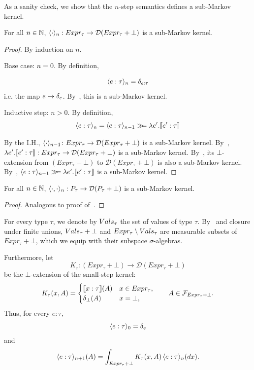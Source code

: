 %
%
As a sanity check, we show that the $n$-step semantics defines a sub-Markov kernel.

\begin{lemma}\label{lem:big-step-n-kernel}
	For all $n \in \mathbb{N}$, $\langle \cdot \rangle_{n} : Expr_{\tau} \to \mathcal{D}(Expr_{\tau} + \bot)$ is a sub-Markov kernel.
\end{lemma}

\begin{proof}
	By induction on $n$. 

	Base case: $n = 0$. By definition, 
	
	\[
		\langle e : \tau \rangle_{n} = \delta_{e : \tau}
	\]
	i.e. the map $e \mapsto \delta_{e}$. By~, this is a sub-Markov kernel.

	Inductive step: $n > 0$. By definition, 
	\[
		\langle e : \tau \rangle_{n} = \langle e : \tau \rangle_{n-1} \gg\!\!=  \lambda e'. \llbracket e' : \tau \rrbracket
	\]
	
	By the I.H., $\langle \cdot \rangle_{n-1} \colon Expr_{\tau} \to \mathcal{D}(Expr_{\tau} + \bot)$ is a sub-Markov kernel. By~, $\lambda e' .\llbracket e' : \tau \rrbracket : Expr_{\tau} \to \mathcal{D}(Expr_{\tau} + \bot)$ is a sub-Markov kernel. By~, its $\bot$-extension from $(Expr_{\tau} + \bot)$ to $\mathcal{D}(Expr_{\tau} + \bot)$ is also a sub-Markov kernel. By~, $\langle e : \tau \rangle_{n-1} \gg\!\!=  \lambda e'. \llbracket e' : \tau \rrbracket$ is a sub-Markov kernel.
\end{proof}

\begin{lemma}\label{lem:big-step-n-coupling-kernel}
	For all $n \in \mathbb{N}$, $\langle \cdot, \cdot \rangle_{n} : P_{\tau} \to \mathcal{D}(P_{\tau} + \bot)$ is a sub-Markov kernel.
\end{lemma}

\begin{proof}
	Analogous to proof of~.
\end{proof}

For every type $\tau$, we denote by $Vals_\tau$ the set of values of
type $\tau$. By~ and closure under finite unions,
$Vals_\tau+\bot$ and $Expr_\tau\setminus Vals_\tau$ are measurable
subsets of $Expr_\tau+\bot$, which we equip with their subspace
$\sigma$-algebras. 

Furthermore, let
\[
K_\tau:(Expr_\tau+\bot)\to\mathcal D(Expr_\tau+\bot)
\]
be the \(\bot\)-extension of the small-step kernel:
\[
K_\tau(x,A)
=
\begin{cases}
\llbracket x:\tau \rrbracket(A) & x\in Expr_\tau,\\
\delta_\bot(A)  & x=\bot,
\end{cases}
\qquad
A\in\mathcal F_{Expr_\tau+\bot}.
\]
Thus, for every \(e:\tau\),
\[
\langle e:\tau \rangle_{0}=\delta_e
\]
and
\[
\langle e:\tau \rangle_{n+1}(A)
=
\int_{Expr_\tau+\bot}
K_\tau(x,A)\,
\langle e:\tau \rangle_{n}(dx).
\]



